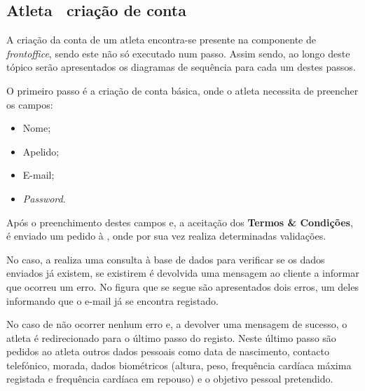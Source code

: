 \subsection{Atleta \textemdash~criação de conta}
\label{registerSequenceDiagram}

A criação da conta de um atleta encontra-se presente na componente de \textit{frontoffice}, sendo este não só executado num passo. Assim sendo, ao longo deste tópico serão apresentados os diagramas de sequência para cada um destes passos.


O primeiro passo é a criação de conta básica, onde o atleta necessita de preencher os campos:

\begin{itemize}
	\item Nome;
	\item Apelido;
	\item E-mail;
	\item \textit{Password}.
\end{itemize}

Após o preenchimento destes campos e, a aceitação dos \textbf{Termos \& Condições}, é enviado um pedido à \textbf{}, onde por sua vez realiza determinadas validações.


No caso, a \textbf{} realiza uma consulta à base de dados para verificar se os dados enviados já existem, se existirem é devolvida uma mensagem ao cliente a informar que ocorreu um erro. No figura que se segue são apresentados dois erros, um deles informando que o e-mail já se encontra registado.


No caso de não ocorrer nenhum erro e, a \textbf{} devolver uma mensagem de sucesso, o atleta é redirecionado para o último passo do registo. Neste último passo são pedidos ao atleta outros dados pessoais como data de nascimento, contacto telefónico, morada, dados biométricos (altura, peso, frequência cardíaca máxima registada e frequência cardíaca em repouso) e o objetivo pessoal pretendido.


